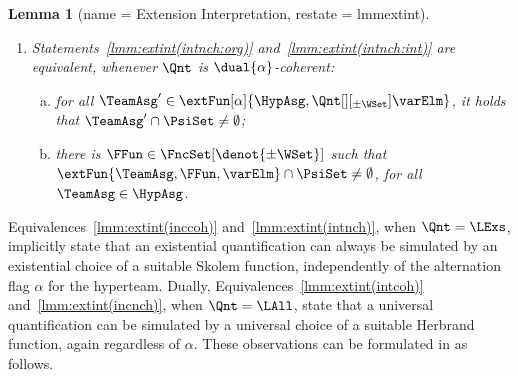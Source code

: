 \documentclass[authoryear]{elsarticle}
\newtheorem{lemma}{Lemma}
\newcommand{\EmpTeamAsg}{\emptyset}
\begin{document}
\begin{lemma}[name = Extension Interpretation, restate = lmmextint]
\begin{enumerate}[1)]
\begin{enumerate}[a)]
          there exists $\TeamAsg' \in \extFun[\alpha]{\HypAsg,
          \Qnt[][_{\pm\WSet}] \varElm}$ such that $\TeamAsg' \subseteq \PsiSet$;
        \item\label{lmm:extint(incnch:int)}
          for all $\FFun \in \FncSet[\denot{\pm\WSet}]{}$, it holds that
          $\extFun{\TeamAsg, \FFun, \varElm} \subseteq \PsiSet$, for some
          $\TeamAsg \in \HypAsg$.
      \end{enumerate}
    \item\label{lmm:extint(intnch)}
      Statements~\ref{lmm:extint(intnch:org)} and~\ref{lmm:extint(intnch:int)}
      are equivalent, whenever $\Qnt$ is $\dual{\alpha}$-coherent:
      \begin{enumerate}[a)]
        \item\label{lmm:extint(intnch:org)}
          for all $\TeamAsg' \in \extFun[\alpha]{\HypAsg, \Qnt[][_{\pm\WSet}]
          \varElm}$, it holds that $\TeamAsg' \cap \PsiSet \neq \EmpTeamAsg$;
        \item\label{lmm:extint(intnch:int)}
          there is $\FFun \in \FncSet[\denot{\pm\WSet}]{}$ such that $\extFun{\TeamAsg,
          \FFun, \varElm} \cap \PsiSet \neq \EmpTeamAsg$, for all $\TeamAsg \in
          \HypAsg$.
      \end{enumerate}
  \end{enumerate}
\end{lemma}

Equivalences~\ref{lmm:extint(inccoh)} and~\ref{lmm:extint(intnch)}, when $\Qnt =
\LExs$, implicitly state that an existential quantification can always be
simulated by an existential choice of a suitable Skolem function, independently
of the alternation flag $\alpha$ for the hyperteam.
Dually, Equivalences~\ref{lmm:extint(intcoh)} and~\ref{lmm:extint(incnch)}, when
$\Qnt = \LAll$, state that a universal quantification can be simulated by a
universal choice of a suitable Herbrand function, again regardless of  $\alpha$.
These observations can be formulated in \Meta as follows.
\end{document}
